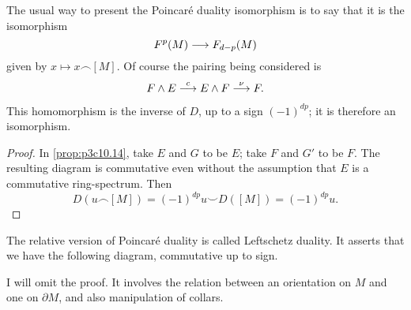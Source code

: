 \documentclass[../main]{subfiles}
\begin{document}
The usual way to present the Poincar\'e duality isomorphism is to say that it is the isomorphism 
\[F^p(M) \longrightarrow F_{d-p}(M)\]
given by $x \mapsto x \frown [M]$. Of course the pairing being considered is
\[F \wedge E \overset{c}{\longrightarrow} E \wedge F \overset{\nu}{\longrightarrow} F.\]
\begin{proposition}\label{prop:p3c10.16}
This homomorphism is the inverse of $D$, up to a sign $(-1)^{dp}$; it is therefore an isomorphism.
\end{proposition}
\begin{proof}
In \ref{prop:p3c10.14}, take $E$ and $G$ to be $E$; take $F$ and $G'$ to be $F$. The resulting diagram is commutative even without the assumption that $E$ is a commutative ring-spectrum. Then
\[D(u \frown [M]) = (-1)^{dp}u \smile D([M]) = (-1)^{dp}u.\]
\end{proof}
The relative version of Poincar\'e duality is called Leftschetz duality. It asserts that we have the following diagram, commutative up to sign.


I will omit the proof. It involves the relation between an orientation on $M$ and one on $\partial M$, and also manipulation of collars.
\end{document}
